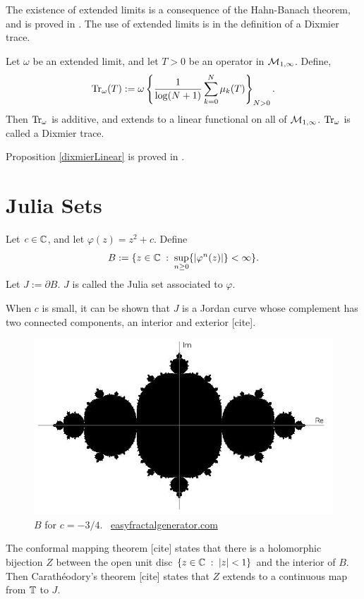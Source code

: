 The existence of extended limits is a consequence of the Hahn-Banach theorem,
and is proved in \cite[Thm 6.2.5]{SingularTraces}. The use
of extended limits is in the definition of a Dixmier trace.

\begin{proposition}
\label{dixmierLinear}
    Let $\omega$ be an extended limit, and let $T > 0$ be an operator
    in $\mathcal{M}_{1,\infty}$. Define,
    \begin{equation}
        \operatorname{Tr}_\omega(T) := \omega\left\{\frac{1}{\log(N+1)}\sum_{k=0}^N \mu_k(T)\right\}_{N > 0}.
    \end{equation}
    Then $\operatorname{Tr}_\omega$ is additive, and extends to a linear functional
    on all of $\mathcal{M}_{1,\infty}$. $\operatorname{Tr}_\omega$ is called a Dixmier trace.
\end{proposition}
Proposition \ref{dixmierLinear} is proved in \cite[Ch. 2]{SingularTraces}.
\section{Julia Sets}
\begin{definition}
    Let $c \in \mathbb{C}$, and let $\varphi(z) = z^2+c$. Define
    \begin{equation}
        B := \{z \in \mathbb{C}\;:\; \sup_{n\geq 0}\{|\varphi^n(z)|\} < \infty\}.
    \end{equation}
    Let $J:= \partial B$. $J$ is called the Julia set associated
    to $\varphi$.
    
    When $c$ is small, it can be shown that $J$ is a Jordan curve
    whose complement has two connected components, an interior and exterior [cite].
\end{definition}
\begin{figure}[h]
    \includegraphics[width=140mm]{Figures/juliaAxes.png}
\caption{$B$ for $c = -3/4$. \textcopyright \, \href{http://www.easyfractalgenerator.com/}{easyfractalgenerator.com}}
\end{figure}
The conformal mapping theorem [cite] states that there is a holomorphic
bijection $Z$ between the open unit disc $\{z \in \mathbb{C}\;:\;|z| < 1\}$
and the interior of $B$. Then Carath\'eodory's theorem [cite]
 states that $Z$ extends to a continuous
map from $\mathbb{T}$ to $J$. 

